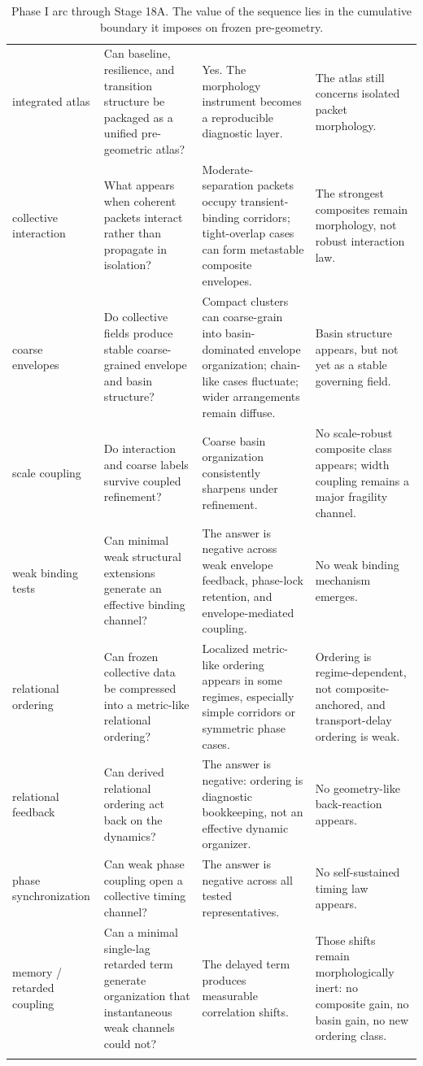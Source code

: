 \documentclass[11pt]{article}
\begin{document}
\begin{longtable}{>{\raggedright\arraybackslash}p{} >{\raggedright\arraybackslash}p{} >{\raggedright\arraybackslash}p{} >{\raggedright\arraybackslash}p{}}
09 integrated atlas & Can baseline, resilience, and transition structure be packaged as a unified pre-geometric atlas? & Yes. The morphology instrument becomes a reproducible diagnostic layer. & The atlas still concerns isolated packet morphology. \\
10 collective interaction & What appears when coherent packets interact rather than propagate in isolation? & Moderate-separation packets occupy transient-binding corridors; tight-overlap cases can form metastable composite envelopes. & The strongest composites remain morphology, not robust interaction law. \\
11 coarse envelopes & Do collective fields produce stable coarse-grained envelope and basin structure? & Compact clusters can coarse-grain into basin-dominated envelope organization; chain-like cases fluctuate; wider arrangements remain diffuse. & Basin structure appears, but not yet as a stable governing field. \\
12 scale coupling & Do interaction and coarse labels survive coupled refinement? & Coarse basin organization consistently sharpens under refinement. & No scale-robust composite class appears; width coupling remains a major fragility channel. \\
13 weak binding tests & Can minimal weak structural extensions generate an effective binding channel? & The answer is negative across weak envelope feedback, phase-lock retention, and envelope-mediated coupling. & No weak binding mechanism emerges. \\
14 relational ordering & Can frozen collective data be compressed into a metric-like relational ordering? & Localized metric-like ordering appears in some regimes, especially simple corridors or symmetric phase cases. & Ordering is regime-dependent, not composite-anchored, and transport-delay ordering is weak. \\
15 relational feedback & Can derived relational ordering act back on the dynamics? & The answer is negative: ordering is diagnostic bookkeeping, not an effective dynamic organizer. & No geometry-like back-reaction appears. \\
16 phase synchronization & Can weak phase coupling open a collective timing channel? & The answer is negative across all tested representatives. & No self-sustained timing law appears. \\
17 memory / retarded coupling & Can a minimal single-lag retarded term generate organization that instantaneous weak channels could not? & The delayed term produces measurable correlation shifts. & Those shifts remain morphologically inert: no composite gain, no basin gain, no new ordering class. \\
\bottomrule
\caption{Phase I arc through Stage 18A. The value of the sequence lies in the cumulative boundary it imposes on frozen pre-geometry.}
\label{tab:arc}
\end{longtable}
\end{document}
